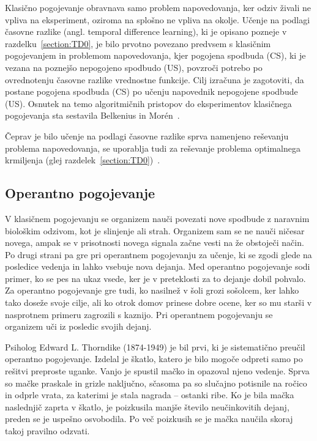 \documentclass[a4paper, oneside, 12pt]{report}
\begin{document}
Klasično pogojevanje obravnava samo problem napovedovanja, ker odziv živali ne vpliva na eksperiment, oziroma na splošno ne vpliva na okolje. Učenje na podlagi časovne razlike (angl. temporal difference learning), ki je opisano pozneje v razdelku~\ref{section:TD0}, je bilo prvotno povezano predvsem s klasičnim pogojevanjem in problemom napovedovanja, kjer pogojena spodbuda (CS), ki je vezana na poznejšo nepogojeno spodbudo (US), povzroči potrebo po ovrednotenju časovne razlike vrednostne funkcije. Cilj izračuna je zagotoviti, da postane pogojena spodbuda (CS) po učenju napovednik nepogojene spodbude (US). Osnutek na temo algoritmičnih pristopov do eksperimentov klasičnega pogojevanja sta sestavila Belkenius in Morén~\cite{ComputationalModelsOfClassicalConditioningAComparativeStudy}.

Čeprav je bilo učenje na podlagi časovne razlike sprva namenjeno reševanju problema napovedovanja, se uporablja tudi za reševanje problema optimalnega krmiljenja (glej razdelek~\ref{section:TD0})~\cite{ReinforcementLearningAnIntroduction}. %

\subsection{Operantno pogojevanje}
V klasičnem pogojevanju se organizem nauči povezati nove spodbude z naravnim biološkim odzivom, kot je slinjenje ali strah. Organizem sam se ne nauči ničesar novega, ampak se v prisotnosti novega signala začne vesti na že obstoječi način. Po drugi strani pa gre pri operantnem pogojevanju za učenje, ki se zgodi glede na posledice vedenja in lahko vsebuje nova dejanja. Med operantno pogojevanje sodi primer, ko se pes na ukaz vsede, ker je v preteklosti za to dejanje dobil pohvalo. Za operantno pogojevanje gre tudi, ko nasilnež v šoli grozi sošolcem, ker lahko tako doseže svoje cilje, ali ko otrok domov prinese dobre ocene, ker so mu starši v nasprotnem primeru zagrozili s kaznijo. Pri operantnem pogojevanju se organizem uči iz posledic svojih dejanj.

Psiholog Edward L. Thorndike (1874-1949) je bil prvi, ki je sistematično preučil operantno pogojevanje. Izdelal je škatlo, katero je bilo mogoče odpreti samo po rešitvi preproste uganke. Vanjo je spustil mačko in opazoval njeno vedenje. Sprva so mačke praskale in grizle naključno, sčasoma pa so slučajno potisnile na ročico in odprle vrata, za katerimi je stala nagrada -- ostanki ribe. Ko je bila mačka naslednjič zaprta v škatlo, je poizkusila manjše število neučinkovitih dejanj, preden se je uspešno osvobodila. Po več poizkusih se je mačka naučila skoraj takoj pravilno odzvati.~\cite{AnimalIntelligence1}
\end{document}
